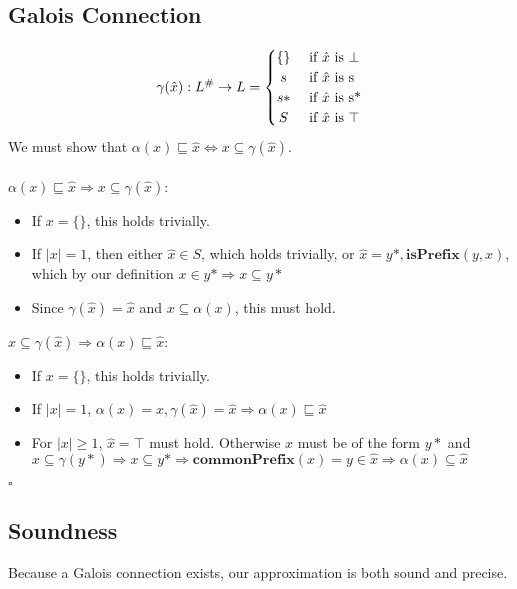 \documentclass{article}
\begin{document}
\subsection{Galois Connection}
\[
 \gamma(\hat{x}): L^\# \rightarrow L =
  \begin{cases} 
      \hfill \{\}    \hfill & \text{ if $\hat{x}$ is $\bot$} \\
      \hfill s \hfill & \text{ if $\hat{x}$ is s} \\
      \hfill s* \hfill & \text{ if $\hat{x}$ is s*} \\
      \hfill S \hfill & \text{ if $\hat{x}$ is $\top$}
  \end{cases}
\]
We must show that $\alpha(x) \sqsubseteq \hat{x} \iff x \subseteq \gamma(\hat{x})$.
\\\\
$\alpha(x) \sqsubseteq \hat{x} \Rightarrow x \subseteq \gamma(\hat{x})$:
\begin{itemize}
	\item If  $x = \{\}$, this holds trivially.
	\item If $|x| = 1$, then either $\hat{x} \in S$, which holds trivially, or $\hat{x} = y*, \mathbf{isPrefix}(y,x)$, which by our definition $x \in y* \Rightarrow x \subseteq y*$ 
	\item Since $\gamma(\hat{x}) = \hat{x}$ and $x \subseteq \alpha(x)$, this must hold.
\end{itemize}
$ x \subseteq \gamma(\hat{x}) \Rightarrow \alpha(x) \sqsubseteq \hat{x}$:
\begin{itemize}
	\item If  $x = \{\}$, this holds trivially.
	\item If $|x| = 1$, $\alpha(x) = x, \gamma(\hat{x}) = \hat{x} \Rightarrow \alpha(x) \sqsubseteq \hat{x}$ 
	\item For $|x| \geq 1$, $\hat{x} = \top$ must hold.   Otherwise $x$ must be of the form $y*$ and $x \subseteq \gamma(y*) \Rightarrow x \subseteq y* \Rightarrow \mathbf{commonPrefix}(x) = y \in \hat{x} \Rightarrow \alpha(x) \subseteq \hat{x}$
	\end{itemize}
$\square$

\subsection{Soundness}
Because a Galois connection exists, our approximation is both sound and precise.
\end{document}
